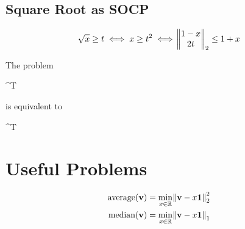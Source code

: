 \subsection{Square Root as SOCP}
\begin{equation}
\sqrt{x}\ge t \iff x\ge t^2 \iff \norm{\begin{matrix} 1-x \\ 2t \end{matrix}}_2 \le 1+x
\end{equation}

The problem
\begin{mini!}{\vx}{\vc^T \vx}{}{}
\end{mini!}
is equivalent to
\begin{mini!}{\vx}{\vc^T \vx}{}{}
\end{mini!}


\section{Useful Problems}

\begin{align}
\textrm{average}(\mathbf{v}) &= \min_{x\in\mathbb{R}} \norm{\mathbf{v}-x\mathbf{1}}_2^2 \\
\textrm{median}(\mathbf{v}) &= \min_{x\in\mathbb{R}} \norm{\mathbf{v}-x\mathbf{1}}_1
\end{align}